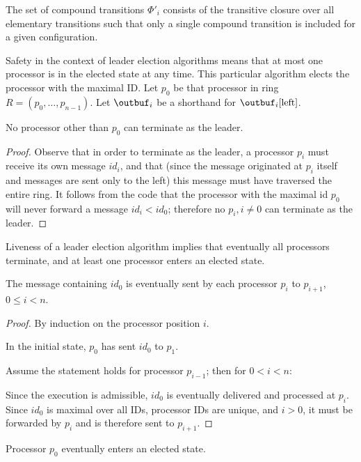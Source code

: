 The set of compound transitions $\Phi'_i$ consists of the transitive closure over all elementary
transitions such that only a single compound transition is included for a given configuration.

Safety in the context of leader election algorithms means that at most one processor is in the
elected state at any time. This particular algorithm elects the processor with the maximal ID.
Let $p_0$ be that processor in ring $R = (p_0, \ldots, p_{n-1})$. Let $\outbuf_i$ be a shorthand for
$\outbuf_i[\text{left}]$.

\begin{theorem}
No processor other than $p_0$ can terminate as the leader.
\end{theorem}

\begin{proof}
Observe that in order to terminate as the leader, a processor $p_i$ must receive its own message
$id_i$, and that (since the message originated at $p_i$ itself and messages are sent only to the left)
this message must have traversed the entire ring. It follows from the code that the processor with
the maximal id $p_0$ will never forward a message $id_i < id_0$; therefore no $p_i, i \neq 0$ can
terminate as the leader.
\end{proof}

Liveness of a leader election algorithm implies that eventually all processors terminate, and
at least one processor enters an elected state.

\begin{lemma} \label{lemma:le-liveness}
The message containing $id_0$ is eventually sent by each processor $p_i$ to $p_{i+1}$,
$0 \leq i < n$.
\end{lemma}

\begin{proof}
By induction on the processor position $i$.

In the initial state, $p_0$ has sent $id_0$ to $p_1$.

Assume the statement holds
for processor $p_{i-1}$; then for $0 < i < n$:

Since the execution is admissible, $id_0$ is eventually
delivered and processed at $p_{i}$. Since $id_0$ is maximal over all IDs, processor IDs
are unique, and $i > 0$, it must be forwarded by $p_i$ and is therefore sent to $p_{i+1}$.
\end{proof}

\begin{theorem} \label{theorem:liveness1}
Processor $p_0$ eventually enters an elected state.
\end{theorem}

